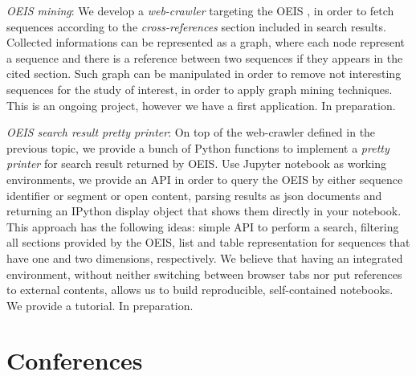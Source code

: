 \documentclass[a4paper]{tufte-handout}
\begin{document}
        \item\emph{OEIS mining}: We develop a \emph{web-crawler} targeting the OEIS , in order
            to fetch sequences according to the \emph{cross-references} section included in search results. Collected 
            informations can be represented as a graph, where each node represent a sequence and there is a reference
            between two sequences if they appears in the cited section. Such graph can be manipulated in order to remove
            not interesting sequences for the study of interest, in order to apply graph mining techniques. This is an
            ongoing project, however we have a first application. In preparation.

        \item\emph{OEIS search result pretty printer}: On top of the web-crawler defined in the previous topic, 
            we provide a bunch of Python functions to implement a
            \emph{pretty printer} for search result returned by OEIS. Use Jupyter notebook as working
            environments, we provide an API in order to query the OEIS by either sequence identifier or
            segment or open content, parsing results as json documents and returning an IPython display object
            that shows them directly in your notebook. This approach has the following ideas: simple API to 
            perform a search, filtering all sections provided by the OEIS, list and table representation 
            for sequences that have one and two dimensions, respectively. We believe that having an integrated
            environment, without neither switching between browser tabs nor put references to external contents, 
            allows us to build reproducible, self-contained notebooks. We provide a tutorial. In preparation.
    \fi
    
    \section{Conferences}
\end{document}
